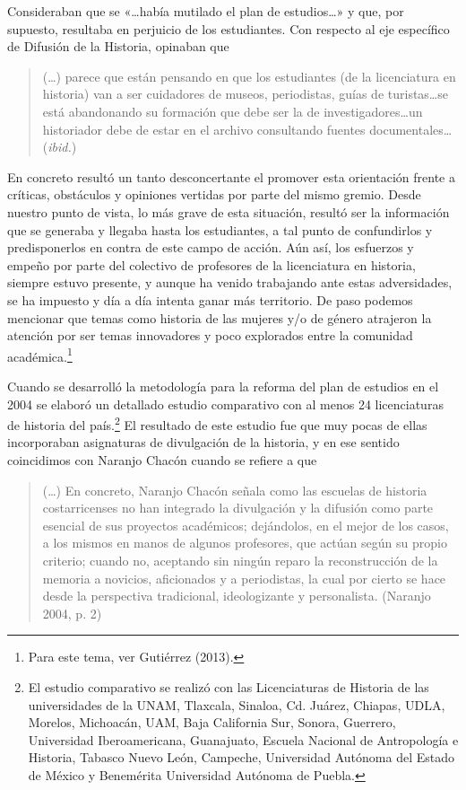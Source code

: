 Consideraban que se «\ldots había mutilado el plan de estudios\ldots» y que, por supuesto,
resultaba en perjuicio de los estudiantes. Con respecto al eje específico de
Difusión de la Historia, opinaban que 


\begin{quotation}
(\ldots) parece que están pensando en que los estudiantes (de la licenciatura en
historia) van a ser cuidadores de museos, periodistas, guías de turistas\ldots se
está abandonando su formación que debe ser la de investigadores\ldots un historiador
debe de estar en el archivo consultando fuentes documentales\ldots (\textit{ibid.})
\end{quotation}

\bigskip
En concreto resultó un tanto desconcertante el promover esta orientación frente
a críticas, obstáculos y opiniones vertidas por parte del mismo gremio. Desde
nuestro punto de vista, lo más grave de esta situación, resultó ser  la
información que se generaba y llegaba hasta los estudiantes, a tal punto de
confundirlos y predisponerlos en contra de este campo de acción. Aún así, los
esfuerzos y empeño por parte del colectivo de profesores de la licenciatura en
historia, siempre  estuvo presente, y aunque ha venido trabajando ante estas
adversidades, se ha impuesto y día a día intenta ganar más territorio. De paso
podemos mencionar que temas como historia de las mujeres y\slash{}o de género
atrajeron la atención por ser temas innovadores y poco explorados entre la
comunidad académica.\footnote{Para este tema, ver Gutiérrez (2013).}

Cuando se desarrolló la metodología para la reforma del plan de estudios en el
2004 se elaboró un detallado estudio comparativo con al menos 24 licenciaturas
de historia del país.\footnote{El estudio comparativo se realizó con las
Licenciaturas de Historia de las universidades de la UNAM, Tlaxcala, Sinaloa,
Cd. Juárez, Chiapas, UDLA, Morelos, Michoacán, UAM, Baja California Sur,
Sonora, Guerrero, Universidad Iberoamericana, Guanajuato, Escuela Nacional de
Antropología e Historia, Tabasco Nuevo León, Campeche, Universidad Autónoma del
Estado de México y Benemérita Universidad  Autónoma de Puebla.} El resultado de
este estudio fue que muy pocas de ellas incorporaban asignaturas de divulgación
de la historia, y en ese sentido coincidimos con Naranjo Chacón cuando se
refiere a que


\begin{quotation}
(\ldots) En concreto, Naranjo Chacón señala como las escuelas de historia
costarricenses no han integrado la divulgación y la difusión como parte
esencial de sus proyectos académicos; dejándolos, en el mejor de los casos, a
los mismos en manos de algunos profesores, que actúan según su propio criterio;
cuando no, aceptando sin ningún reparo la reconstrucción de la memoria a
novicios, aficionados y a periodistas, la cual por cierto se hace desde la
perspectiva tradicional, ideologizante y personalista. (Naranjo
2004, p. 2)
\end{quotation}

